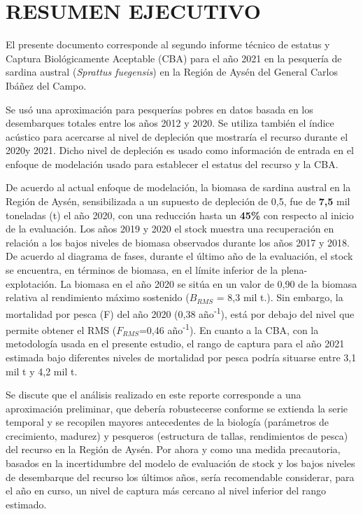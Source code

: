 \documentclass[
  spanish,
]{article}
\author{}
\date{\vspace{-2.5em}}
\begin{document}
{
\setcounter{tocdepth}{3}
\tableofcontents
}
\pagebreak

\hypertarget{resumen-ejecutivo}{%
\section{RESUMEN EJECUTIVO}\label{resumen-ejecutivo}}

El presente documento corresponde al segundo informe técnico de estatus
y Captura Biológicamente Aceptable (CBA) para el año 2021 en la
pesquería de sardina austral (\emph{Sprattus fuegensis}) en la Región de
Aysén del General Carlos Ibáñez del Campo.

Se usó una aproximación para pesquerías pobres en datos basada en los
desembarques totales entre los años 2012 y 2020. Se utiliza también el
índice acústico para acercarse al nivel de depleción que mostraría el
recurso durante el 2020y 2021. Dicho nivel de depleción es usado como
información de entrada en el enfoque de modelación usado para establecer
el estatus del recurso y la CBA.

De acuerdo al actual enfoque de modelación, la biomasa de sardina
austral en la Región de Aysén, sensibilizada a un supuesto de depleción
de 0,5, fue de \textbf{7,5} mil toneladas (t) el año 2020, con una
reducción hasta un \textbf{45\%} con respecto al inicio de la
evaluación. Los años 2019 y 2020 el stock muestra una recuperación en
relación a los bajos niveles de biomasa observados durante los años 2017
y 2018. De acuerdo al diagrama de fases, durante el último año de la
evaluación, el stock se encuentra, en términos de biomasa, en el límite
inferior de la plena-explotación. La biomasa en el año 2020 se sitúa en
un valor de 0,90 de la biomasa relativa al rendimiento máximo sostenido
(\(B_{RMS}\) = 8,3 mil t.). Sin embargo, la mortalidad por pesca (F) del
año 2020 (0,38 año\textsuperscript{-1}), está por debajo del nivel que
permite obtener el RMS (\(F_{RMS}\)=0,46 año\textsuperscript{-1}). En
cuanto a la CBA, con la metodología usada en el presente estudio, el
rango de captura para el año 2021 estimada bajo diferentes niveles de
mortalidad por pesca podría situarse entre 3,1 mil t y 4,2 mil t.

Se discute que el análisis realizado en este reporte corresponde a una
aproximación preliminar, que debería robustecerse conforme se extienda
la serie temporal y se recopilen mayores antecedentes de la biología
(parámetros de crecimiento, madurez) y pesqueros (estructura de tallas,
rendimientos de pesca) del recurso en la Región de Aysén. Por ahora y
como una medida precautoria, basados en la incertidumbre del modelo de
evaluación de stock y los bajos niveles de desembarque del recurso los
últimos años, sería recomendable considerar, para el año en curso, un
nivel de captura más cercano al nivel inferior del rango estimado.
\end{document}
